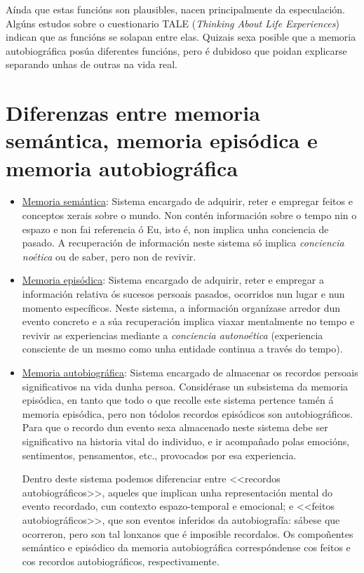 \documentclass[a4paper,11pt]{article}
\begin{document}
Aínda que estas funcións son plausibles, nacen principalmente da especulación. Algúns estudos sobre o cuestionario TALE (\textit{Thinking About Life Experiences}) indican que as funcións se solapan entre elas. Quizais sexa posible que a memoria autobiográfica posúa diferentes funcións, pero é dubidoso que poidan explicarse separando unhas de outras na vida real.

\section{Diferenzas entre memoria semántica, memoria episódica e memoria autobiográfica}
\begin{itemize}
	\item \underline{Memoria semántica}: Sistema encargado de adquirir, reter e empregar feitos e
	conceptos xerais sobre o mundo. Non contén información sobre o tempo nin o espazo e non fai
	referencia ó Eu, isto é, non implica unha conciencia de pasado. A recuperación de información
	neste sistema só implica \textit{conciencia noética} ou de saber, pero non de revivir.
	\item \underline{Memoria episódica}: Sistema encargado de adquirir, reter e empregar a
	información relativa ós sucesos persoais pasados, ocorridos nun lugar e nun momento específicos.
	Neste sistema, a información organízase arredor dun evento concreto e a súa recuperación implica
	viaxar mentalmente no tempo e revivir as experiencias mediante a \textit{conciencia 
	autonoética} (experiencia consciente de un mesmo como unha entidade continua a través do tempo).
	\item \underline{Memoria autobiográfica}: Sistema encargado de almacenar os recordos persoais
	significativos na vida dunha persoa. Considérase un subsistema da memoria episódica, en tanto
	que todo o que recolle este sistema pertence tamén á memoria episódica, pero non tódolos
	recordos episódicos son autobiográficos. Para que o recordo dun evento sexa almacenado neste 
	sistema debe ser significativo na historia vital do individuo, e ir acompañado polas emocións,
	sentimentos, pensamentos, etc., provocados por esa experiencia. 
	
	Dentro deste sistema podemos diferenciar entre <<recordos autobiográficos>>, aqueles que
	implican unha representación mental do evento recordado, cun contexto espazo-temporal e
	emocional; e <<feitos autobiográficos>>, que son eventos inferidos da autobiografía: sábese que
	ocorreron, pero son tal lonxanos que é imposible recordalos. Os compoñentes semántico e
	episódico da memoria autobiográfica correspóndense cos feitos e cos recordos autobiográficos, 
	respectivamente.
\end{itemize}
\end{document}
